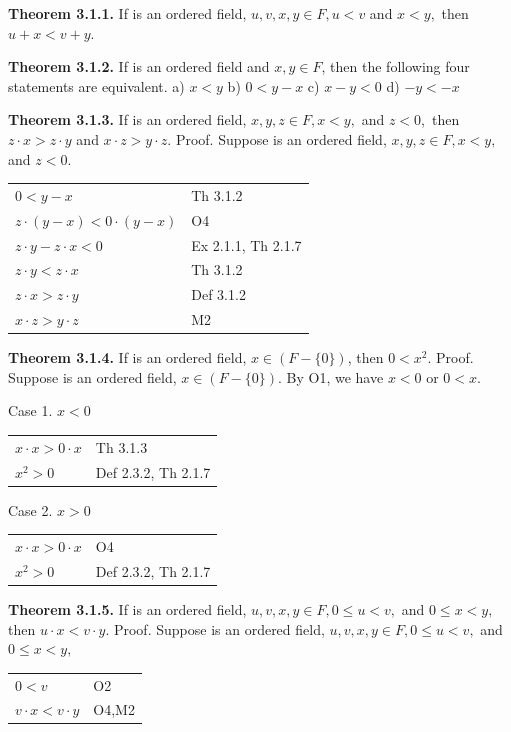 \begin{large}
\textbf{Theorem 3.1.1.} If \of is an ordered field, $u,v,x,y\in F, u < v$ and $x < y,$ then $u + x < v + y.$ \nl

\textbf{Theorem 3.1.2.} If \of is an ordered field and $x,y\in F$, then the following four statements are equivalent.\nl
 a) $x < y$ \qquad b) $0 < y - x$ \qquad c) $x - y < 0$ \qquad d) $-y < -x$ \nl

\textbf{Theorem 3.1.3.} If \of is an ordered field, $x,y,z\in F, x < y,$ and $z < 0$,~then $z\cdot x > z\cdot y$ and $x\cdot z > y\cdot z.$\nl
Proof. Suppose \of is an ordered field, $x,y,z\in F, x < y,$ and $z < 0.$\nl

\newpage

\begin{tabular}{l l}
$0 < y - x$& Th 3.1.2\\
 $z\cdot (y - x) < 0\cdot (y - x)$&O4 \\
 $z\cdot y - z\cdot x < 0$ &Ex 2.1.1, Th 2.1.7 \\
 $z\cdot y <z \cdot x$& Th 3.1.2 \\
 $z\cdot x > z\cdot y$&Def 3.1.2 \\
 $x\cdot z > y\cdot z$ &M2 \\
\end{tabular}\nl

\textbf{Theorem 3.1.4.} If \of  is an ordered field, $x \in (F-\{0\})$, then $ 0 <x^{2}$. \nl
 Proof. Suppose \of  is an ordered field, $x \in (F-\{0\})$.
 By O1, we have $x < 0$ or $0 < x.$\nl

\qqu  Case 1. $x < 0$ \nl
\begin{tabular}{l l}
$x\cdot x > 0\cdot x$ & Th 3.1.3\\
$x^{2} > 0$&  Def 2.3.2, Th 2.1.7\\
\end{tabular}\nl

\qqu Case 2. $x > 0$\nl
\begin{tabular}{l l}
$x\cdot x >0\cdot x$& O4\\
$x^{2} > 0$ &Def 2.3.2, Th 2.1.7\\
\end{tabular}\nl

\textbf{Theorem 3.1.5.} If \of is an ordered field, $u,v,x,y\in F, 0 \leq u < v,$ and $0\leq x < y,$ then $u\cdot x < v\cdot y.$\nl
Proof. Suppose  \of is an ordered field, $u,v,x,y\in F, 0 \leq u < v,$ and $0\leq x < y,$\nl

\begin{tabular}{l l}
$0 < v$& O2\\
$v\cdot x < v\cdot y$& O4,M2 \\
\end{tabular}\nl


\end{large}
